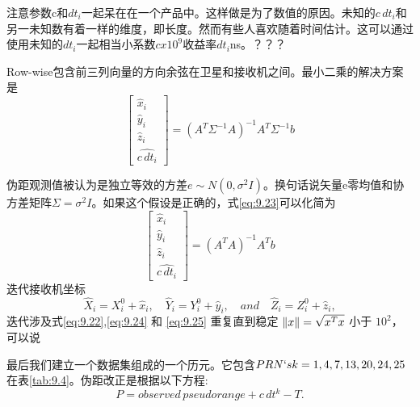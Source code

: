 	注意参数c和$dt_i$一起呆在在一个产品中。这样做是为了数值的原因。未知的$c\,dt_i$和另一未知数有着一样的维度，即长度。然而有些人喜欢随着时间估计。这可以通过使用未知的$dt_i$一起相当小系数$c x 10^9$收益率$dt_i$ns。？？？
	
	Row-wise包含前三列向量的方向余弦在卫星和接收机之间。最小二乘的解决方案是
	\begin{equation}\label{eq:9.23}
	\begin{bmatrix}
	\hat{x}_i \\ \hat{y}_i \\ \hat{z}_i \\ \widehat{c\,dt_i}
	\end{bmatrix}
	=(A^T\Sigma^{-1}A)^{-1}A^T\Sigma^{-1}b
	\end{equation}
	
	伪距观测值被认为是独立等效的方差$e\sim N(0,\sigma^2I)$。换句话说矢量e零均值和协方差矩阵$\Sigma=\sigma^2I$。如果这个假设是正确的，式\ref{eq:9.23}可以化简为
	\begin{equation}\label{eq:9.24}
	\begin{bmatrix}
	\hat{x}_i \\ \hat{y}_i \\ \hat{z}_i \\ \widehat{c\,dt_i}
	\end{bmatrix}
	=(A^TA)^{-1}A^Tb
	\end{equation}
	迭代接收机坐标
	\begin{equation}\label{eq:9.25}
	\hat{X}_i=X^0_i+\hat{x}_i,\quad \hat{Y}_i=Y^0_i+\hat{y}_i,\quad and \quad \hat{Z}_i=Z^0_i+\hat{z}_i,
	\end{equation}
	迭代涉及式\ref{eq:9.22},\ref{eq:9.24} 和 \ref{eq:9.25} 重复直到稳定 $\Arrowvert x\Arrowvert=\sqrt{x^Tx}$ 小于 $10^2$，可以说
	
	最后我们建立一个数据集组成的一个历元。它包含$PRN`s k = 1,4,7,13,20,24,25$在表\ref{tab:9.4}。伪距改正是根据以下方程:
	\begin{equation}\label{eq:9.26}
	P = observed\,pseudorange + c\,dt^k-T.
	\end{equation}
	
